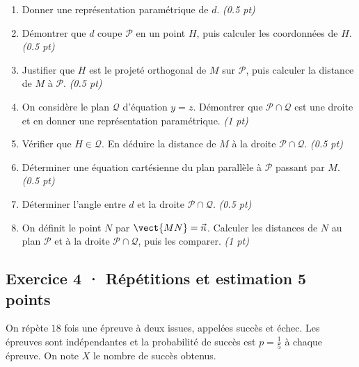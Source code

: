 \begin{enumerate}

\item Donner une représentation paramétrique de $d$. \hfill\textit{(\num{0,5} pt)}

\item Démontrer que $d$ coupe $\mathcal P$ en un point $H$, puis calculer les coordonnées de $H$. \hfill\textit{(\num{0,5} pt)}

\item Justifier que $H$ est le projeté orthogonal de $M$ sur $\mathcal P$, puis calculer la distance de $M$ à $\mathcal P$. \hfill\textit{(\num{0,5} pt)}

\item On considère le plan $\mathcal Q$ d'équation $y=z$. Démontrer que $\mathcal P\cap\mathcal Q$ est une droite et en donner une représentation paramétrique. \hfill\textit{(1 pt)}

\item Vérifier que $H\in\mathcal Q$. En déduire la distance de $M$ à la droite $\mathcal P\cap\mathcal Q$. \hfill\textit{(\num{0,5} pt)}

\item Déterminer une équation cartésienne du plan parallèle à $\mathcal P$ passant par $M$. \hfill\textit{(\num{0,5} pt)}

\item Déterminer l'angle entre $d$ et la droite $\mathcal P\cap\mathcal Q$. \hfill\textit{(\num{0,5} pt)}

\item On définit le point $N$ par $\vect{MN}=\vec n$. Calculer les distances de $N$ au plan $\mathcal P$ et à la droite $\mathcal P\cap\mathcal Q$, puis les comparer. \hfill\textit{(1 pt)}

\end{enumerate}

\subsection*{Exercice 4 · Répétitions et estimation \hfill 5 points}On répète $18$ fois une épreuve à deux issues, appelées succès et échec. Les épreuves sont indépendantes et la probabilité de succès est $p=\frac{1}{5}$ à chaque épreuve. On note $X$ le nombre de succès obtenus.


